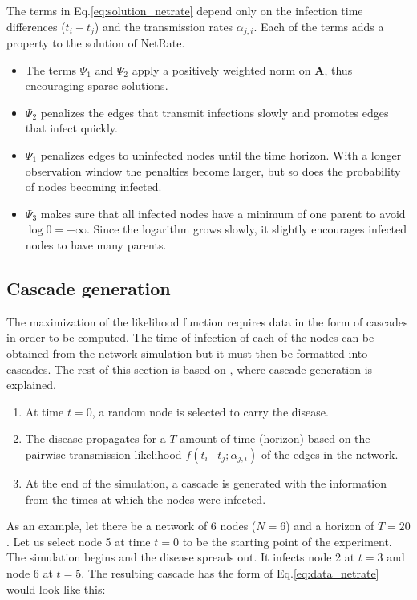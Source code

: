 The terms in Eq.\ref{eq:solution_netrate} depend only on the infection time differences ($t_{i}-t_{j}$) and the transmission rates $\alpha_{j,i}$. Each of the terms adds a property to the solution of NetRate.

\begin{itemize}
\item The terms $\Psi_{1}$ and $\Psi_{2}$ apply a positively weighted norm on $\textbf{A}$, thus encouraging sparse solutions.
\item $\Psi_{2}$ penalizes the edges that transmit infections slowly and promotes edges that infect quickly.
\item $\Psi_{1}$ penalizes edges to uninfected nodes until the time horizon. With a longer observation window the penalties become larger, but so does the probability of nodes becoming infected.
\item $\Psi_{3}$ makes sure that all infected nodes have a minimum of one parent to avoid $\log 0 = -\infty$. Since the logarithm grows slowly, it slightly encourages infected nodes to have many parents.
\end{itemize}

\subsection{Cascade generation}\label{sec:cascade_generation}

The maximization of the likelihood function requires data in the form of cascades in order to be computed. The time of infection of each of the nodes can be obtained from the network simulation but it must then be formatted into cascades. The rest of this section is based on \cite{pranav_report}, where cascade generation is explained. 

\begin{enumerate}
\item At time $t=0$, a random node is selected to carry the disease.
\item The disease propagates for a $T$ amount of time (horizon) based on the pairwise transmission likelihood $f(t_{i}\mid t_{j};\alpha_{j,i})$ of the edges in the network.
\item At the end of the simulation, a cascade is generated with the information from the times at which the nodes were infected. 
\end{enumerate}

As an example, let there be a network of 6 nodes ($N=6$) and a horizon of $T=20$. Let us select node 5 at time $t=0$ to be the starting point of the experiment. The simulation begins and the disease spreads out. It infects node 2 at $t=3$ and node 6 at $t=5$. The resulting cascade has the form of Eq.\ref{eq:data_netrate}  would look like this:

